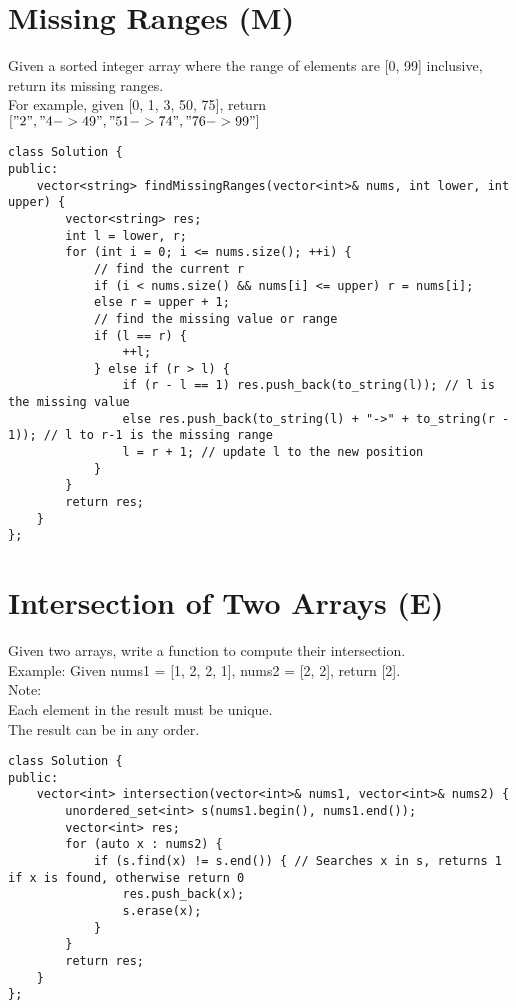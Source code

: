 \section{Missing Ranges (M)}
Given a sorted integer array where the range of elements are [0, 99] inclusive, return its missing ranges.\\

For example, given [0, 1, 3, 50, 75], return $["2", "4->49", "51->74", "76->99"]$ \\

\begin{lstlisting}
class Solution {
public:
    vector<string> findMissingRanges(vector<int>& nums, int lower, int upper) {
        vector<string> res;
        int l = lower, r;
        for (int i = 0; i <= nums.size(); ++i) {
            // find the current r
            if (i < nums.size() && nums[i] <= upper) r = nums[i];
            else r = upper + 1;
            // find the missing value or range
            if (l == r) {
                ++l;
            } else if (r > l) {
                if (r - l == 1) res.push_back(to_string(l)); // l is the missing value
                else res.push_back(to_string(l) + "->" + to_string(r - 1)); // l to r-1 is the missing range
                l = r + 1; // update l to the new position
            }
        }
        return res;
    }
};
\end{lstlisting}


\section{Intersection of Two Arrays (E)}
Given two arrays, write a function to compute their intersection.\\

Example:
Given nums1 = [1, 2, 2, 1], nums2 = [2, 2], return [2].\\

Note: \\
    Each element in the result must be unique.\\
    The result can be in any order.\\
    
\begin{lstlisting}
class Solution {
public:
    vector<int> intersection(vector<int>& nums1, vector<int>& nums2) {
        unordered_set<int> s(nums1.begin(), nums1.end());
        vector<int> res;
        for (auto x : nums2) {
            if (s.find(x) != s.end()) { // Searches x in s, returns 1 if x is found, otherwise return 0
                res.push_back(x);
                s.erase(x);
            }
        }
        return res;
    }
};
\end{lstlisting}   



